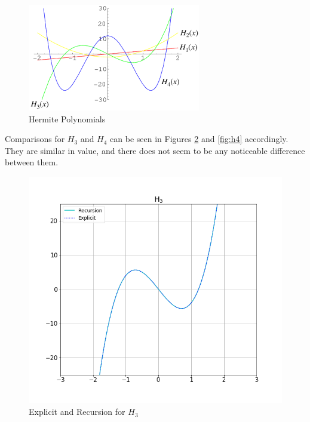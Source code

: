 \documentclass[twocolumn]{article}
\begin{document}
\begin{figure}[h!]
  \centering
  \includegraphics[scale = 0.4]{hwolfram}
  \caption{Hermite Polynomials \cite{weissteinH}}
  \label{fig:hwolf}
\end{figure}
Comparisons for $H_3$ and $H_4$ can be seen in Figures \ref{fig:h3} and \ref{fig:h4} accordingly. They are similar in value, and there does not seem to be any noticeable
difference between them. 

\begin{figure}[h]
  \centering
  \includegraphics[scale = 0.4]{h3}
  \caption{Explicit and Recursion for $H_3$}
  \label{fig:h3}
\end{figure}
\end{document}
